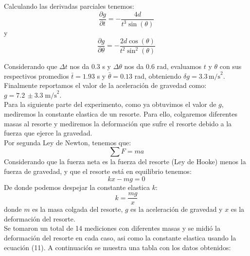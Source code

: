 \documentclass{article}
\begin{document}
Calculando las derivadas parciales tenemos:
\begin{equation}
   \dfrac{\partial g}{\partial t} = -\dfrac{4d}{t^3 \sin(\theta)}
\end{equation}
y
\begin{equation}
   \dfrac{\partial g}{\partial \theta} = -\dfrac{2d \cos(\theta)}{t^2 \sin^2(\theta)}
\end{equation}

Considerando que $\Delta t$ nos da 0.3 s y $\Delta \theta$ nos da 0.6 rad,
evaluamos $t$ y $\theta$ con sus respectivos promedios $\bar{t} = 1.93$ s y
$\bar{\theta} = 0.13$ rad, obteniendo $\delta g = 3.3 \, \text{m/s}^2$. \\

Finalmente reportamos el valor de la aceleración de gravedad como: 
$g = 7.2 \, \pm 3.3 \; \text{m/s}^2$. \\

Para la siguiente parte del experimento, como ya obtuvimos el valor de $g$, 
mediremos la constante elastica de un resorte. Para ello, colgaremos 
diferentes masas al resorte y mediremos la deformación que sufre el resorte
debido a la fuerza que ejerce la gravedad. \\

Por segunda Ley de Newton, 
tenemos que:
\begin{equation}
   \sum F = ma
\end{equation}
Considerando que la fuerza neta es la fuerza del resorte (Ley de Hooke) 
menos la fuerza de gravedad, y que el resorte está en equilibrio tenemos:
\begin{equation}
   kx - mg = 0
\end{equation}
De donde podemos despejar la constante elastica $k$:
\begin{equation}
   k = \dfrac{mg}{x}
\end{equation}
donde $m$ es la masa colgada del resorte, $g$ es la aceleración de gravedad
y $x$ es la deformación del resorte. \\

Se tomaron un total de 14 mediciones con diferentes masas y se midió la
deformación del resorte en cada caso, asi como la constante elastica usando
la ecuación (11). A continuación se muestra una tabla con los datos 
obtenidos:
\end{document}
